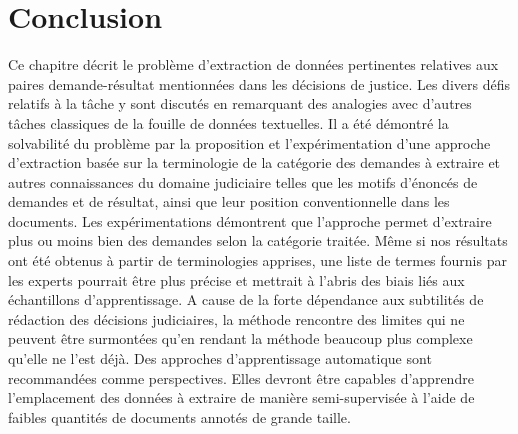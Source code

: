 \section{Conclusion}
\label{sec:quanta:conclusion}
Ce chapitre décrit le problème d'extraction de données pertinentes relatives aux paires demande-résultat mentionnées dans les décisions de justice. Les divers défis relatifs à la tâche  y sont discutés en remarquant des analogies avec d'autres tâches classiques de la fouille de données textuelles. Il a été démontré la solvabilité du problème par la proposition et l'expérimentation d'une approche d'extraction basée sur la terminologie de la  catégorie des demandes à extraire et autres connaissances du domaine judiciaire telles que les motifs d'énoncés de demandes et de résultat, ainsi que leur position conventionnelle dans les documents.  Les expérimentations démontrent que l'approche permet d'extraire plus ou moins bien des demandes selon la catégorie traitée. Même si nos résultats ont été obtenus à partir de terminologies apprises, une liste de termes fournis par les experts pourrait être plus précise et mettrait à l'abris des biais liés aux échantillons d'apprentissage. A cause de la  forte dépendance aux subtilités de rédaction des décisions judiciaires, la méthode rencontre des limites qui ne peuvent être surmontées qu'en rendant la méthode beaucoup plus complexe qu'elle ne l'est déjà. Des approches d'apprentissage automatique sont recommandées comme perspectives. Elles devront être capables d'apprendre l'emplacement des données à extraire de manière semi-supervisée à l'aide de faibles quantités de documents annotés de grande taille.
